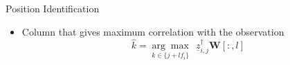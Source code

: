 \documentclass[10pt,xcolor=table]{beamer}
\newcommand{\mc}{\mathcal}
\newcommand{\mbb}{\mathbb}
\newcommand{\zv}{\underline{z}}
\begin{document}
\begin{frame}
{\begin{block}{Position Identification}
\begin{itemize}
			\item Column that gives {\color {blue} maximum correlation} with the observation\\
			{ \[\boxed{\hat{k} = \underset{k\in\{j+l f_i\}}{\arg \max}~~ \zv^{\dagger}_{i,j} \mathbf{W}[:,l]}\]}
		\end{itemize}
	
		\end{block}}

\end{frame}
\end{document}
